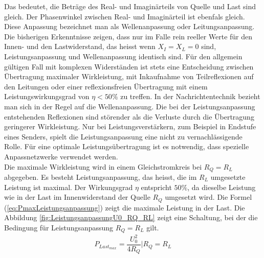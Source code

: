 Das bedeutet, die Beträge des Real- und Imaginärteils von Quelle und Last sind gleich.  Der Phasenwinkel zwischen Real- und Imaginärteil ist ebenfals gleich. Diese Anpassung bezeichnet man als Wellenanpassung oder Leitungsanpassung. Die bisherigen Erkenntnisse zeigen, dass nur im Falle rein reeller Werte für den Innen- und den  Lastwiderstand, das heisst wenn $X_I = X_L = 0$ sind, Leistungsanpassung und Wellenanpassung identisch sind. Für den allgemein gültigen Fall mit komplexen Widerständen ist stets eine Entscheidung zwischen Übertragung maximaler Wirkleistung,  mit Inkaufnahme von Teilreflexionen auf den Leitungen oder einer reflexionsfreien Übertragung mit einem Leistungswirkungsgrad von $\eta <50 \%$ zu treffen. In der Nachrichtentechnik bezieht man sich in der Regel auf die Wellenanpassung. Die bei der Leistungsanpassung entstehenden Reflexionen  sind störender als die Verluste durch die Übertragung geringerer Wirkleistung. Nur bei Leistungsverstärkern, zum Beispiel in Endstufe eines Senders, spielt die Leistungsanpassung eine nicht zu vernachlässigende Rolle. Für eine optimale Leistungsübertragung ist es notwendig, dass spezielle Anpassnetzwerke verwendet werden. \\

Die maximale Wirkleistung wird in einem Gleichstromkreis bei $R_Q = R_L$ abgegeben. Es besteht Leistungsanpassung, das heisst, die im $R_L$ umgesetzte Leistung ist maximal. Der Wirkungsgrad $\eta$ entspricht $50\%$, da dieselbe Leistung wie in der Last im Innenwiderstand der Quelle $R_Q$ umgesetzt wird. Die Formel (\ref{eq:PmaxLeistungsanpassung}) zeigt die maximale Leistung in der Last. Die Abbildung \ref{fig:LeistungsanpassungU0_RQ_RL} zeigt eine Schaltung, bei der die Bedingung für Leistungsanpassung $R_Q = R_L$ gilt.
\begin{eqnarray}\label{eq:PmaxLeistungsanpassung}
P_{Last_{max}}=\dfrac{U_{0}^2}{4R_Q} | R_Q=R_L
\end{eqnarray}

